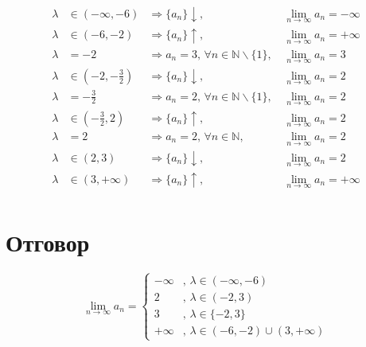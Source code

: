\documentclass{article}
\begin{document}
\begin{align*}
    \lambda &\in (-\infty, -6) &\Longrightarrow \{a_n\}\downarrow ,&\, \lim_{n \to \infty} a_n = -\infty \\
    \lambda &\in (-6, -2) &\Longrightarrow \{a_n\}\uparrow ,&\, \lim_{n \to \infty} a_n = +\infty \\
    \lambda &= -2 &\Longrightarrow a_n = 3,\, \forall n \in \mathbb{N}\backslash\{1\},&\, \lim_{n \to \infty} a_n = 3 \\
    \lambda &\in \left(-2, -\frac{3}{2}\right) &\Longrightarrow \{a_n\}\downarrow ,&\, \lim_{n \to \infty} a_n = 2 \\
    \lambda &= -\frac{3}{2} &\Longrightarrow a_n = 2,\, \forall n \in \mathbb{N}\backslash\{1\},&\, \lim_{n \to \infty} a_n = 2 \\
    \lambda &\in \left(-\frac{3}{2}, 2\right) &\Longrightarrow \{a_n\}\uparrow ,&\, \lim_{n \to \infty} a_n = 2 \\
    \lambda &= 2 &\Longrightarrow a_n = 2,\, \forall n \in \mathbb{N},&\, \lim_{n \to \infty} a_n = 2 \\
    \lambda &\in (2, 3) &\Longrightarrow \{a_n\}\downarrow ,&\, \lim_{n \to \infty} a_n = 2 \\
    \lambda &\in (3, +\infty) &\Longrightarrow \{a_n\}\uparrow ,&\, \lim_{n \to \infty} a_n = +\infty \\
\end{align*}

\section{Отговор}

\begin{equation*}
    \lim_{n \to \infty} a_n =
    \begin{cases}
        -\infty &,\, \lambda \in (-\infty, -6) \\
        2       &,\, \lambda \in (-2, 3) \\
        3       &,\, \lambda \in \{-2, 3\} \\
        +\infty &,\, \lambda \in (-6, -2) \cup (3, +\infty)
    \end{cases}
\end{equation*}
\end{document}
